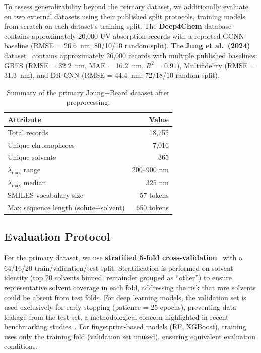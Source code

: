 \documentclass[11pt,a4paper]{article}
\begin{document}
To assess generalizability beyond the primary dataset, we additionally evaluate on two external datasets using their published split protocols, training models from scratch on each dataset's training split.
The \textbf{Deep4Chem} database~\cite{joung2021deep} contains approximately 20,000 UV absorption records with a reported GCNN baseline (RMSE = 26.6~nm; 80/10/10 random split).
The \textbf{Jung et al.\ (2024)} dataset~\cite{jung2024machine} contains approximately 26,000 records with multiple published baselines: GBFS (RMSE = 32.2~nm, MAE = 16.2~nm, $R^2$ = 0.91), Multifidelity (RMSE = 31.3~nm), and DR-CNN (RMSE = 44.4~nm; 72/18/10 random split).

\begin{table}[t]
\centering
\caption{Summary of the primary Joung+Beard dataset after preprocessing.}
\label{tab:dataset_summary}
\begin{tabular}{lr}
\toprule
\textbf{Attribute} & \textbf{Value} \\
\midrule
Total records & 18,755 \\
Unique chromophores & 7,016 \\
Unique solvents & 365 \\
$\lambda_{\max}$ range & 200--900 nm \\
$\lambda_{\max}$ median & 325 nm \\
SMILES vocabulary size & 57 tokens \\
Max sequence length (solute+solvent) & 650 tokens \\
\bottomrule
\end{tabular}
\end{table}


\subsection{Evaluation Protocol}
\label{sec:evaluation}

For the primary dataset, we use \textbf{stratified 5-fold cross-validation}~\cite{kohavi1995study} with a 64/16/20 train/validation/test split.
Stratification is performed on solvent identity (top 20 solvents binned, remainder grouped as ``other'') to ensure representative solvent coverage in each fold, addressing the risk that rare solvents could be absent from test folds.
For deep learning models, the validation set is used exclusively for early stopping (patience = 25 epochs), preventing data leakage from the test set, a methodological concern highlighted in recent benchmarking studies~\cite{panapitiya2022evaluation}.
For fingerprint-based models (RF, XGBoost), training uses only the training fold (validation set unused), ensuring equivalent evaluation conditions.
\end{document}
